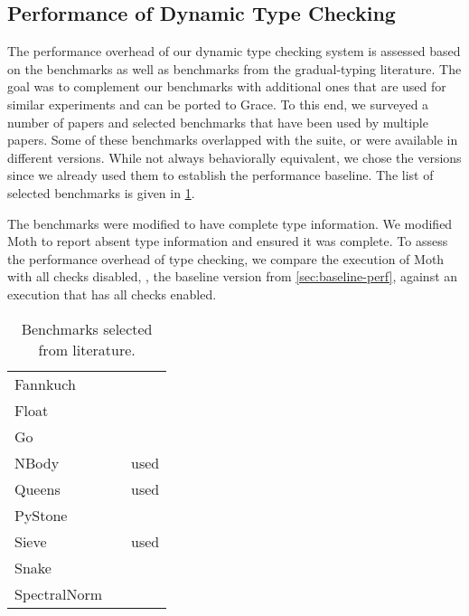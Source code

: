 \subsection{Performance of Dynamic Type Checking}


The performance overhead of our dynamic type checking system
is assessed based on the \AWFY benchmarks
as well as benchmarks from the gradual-typing literature.
The goal was to complement our benchmarks with additional ones that are
used for similar experiments and can be ported to Grace.
To this end, we surveyed a number of papers\citep{Takikawa2016,Vitousek2017,Muehlboeck2017,Bauman2017,Richards2017,Stulova2016,Greenman2018}
and selected benchmarks that have been used by multiple papers.
Some of these benchmarks overlapped with the \AWFY suite,
or were available in different versions.
While not always behaviorally equivalent,
we chose the \AWFY versions since we already used them to
establish the performance baseline.
The list of selected benchmarks is given in \cref{tab:gradual-benchmarks}.

The benchmarks were modified to have complete type information.
We modified Moth to report absent type information and ensured it was complete.
To assess the performance overhead of type checking,
we compare the execution of Moth with all checks disabled, \ie, the baseline version from 
\cref{sec:baseline-perf}, against an execution that has all checks enabled.


\begin{table}
\caption{Benchmarks selected from literature.}
\label{tab:gradual-benchmarks}
\begin{tabular}{l l r}
Fannkuch & \cite{Vitousek2017,Greenman2018} \\
Float & \cite{Vitousek2017,Muehlboeck2017,Greenman2018} \\
Go & \cite{Vitousek2017,Muehlboeck2017,Greenman2018} \\
NBody & \cite{Kuhlenschmidt:2018:preprint,Vitousek2017,Greenman2018} & used \cite{Marr2016} \\
Queens & \cite{Vitousek2017,Muehlboeck2017,Greenman2018} & used \cite{Marr2016} \\
PyStone & \cite{Vitousek2017,Muehlboeck2017,Greenman2018} \\
Sieve & \cite{Takikawa2016,Muehlboeck2017,Bauman2017,Richards2017} & used \cite{Marr2016} \\
Snake & \cite{Takikawa2016,Muehlboeck2017,Bauman2017,Richards2017} \\
SpectralNorm & \cite{Vitousek2017,Muehlboeck2017,Greenman2018} \\
\end{tabular}
\end{table}


